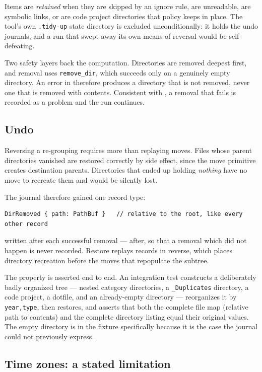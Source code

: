 \documentclass[11pt,a4paper]{article}
\newcommand{\code}[1]{\texttt{\small #1}}
\begin{document}
Items are \emph{retained} when they are skipped by an ignore rule, are unreadable,
are symbolic links, or are code project directories that policy keeps in place. The
tool's own \code{.tidy-up} state directory is excluded unconditionally: it holds the
undo journals, and a run that swept away its own means of reversal would be
self-defeating.

Two safety layers back the computation. Directories are removed deepest first, and
removal uses \code{remove\_dir}, which succeeds only on a genuinely empty directory.
An error in  therefore produces a directory that is not removed,
never one that is removed with contents. Consistent with , a
removal that fails is recorded as a problem and the run continues.

\subsection{Undo}
\label{sec:regroup:undo}

Reversing a re-grouping requires more than replaying moves. Files whose parent
directories vanished are restored correctly by side effect, since the move primitive
creates destination parents. Directories that ended up holding \emph{nothing} have no
move to recreate them and would be silently lost.

The journal therefore gained one record type:

\begin{lstlisting}
DirRemoved { path: PathBuf }   // relative to the root, like every other record
\end{lstlisting}

written after each successful removal --- after, so that a removal which did not
happen is never recorded. Restore replays records in reverse, which places directory
recreation before the moves that repopulate the subtree.

The property is asserted end to end. An integration test constructs a deliberately
badly organized tree --- nested category directories, a \code{\_Duplicates} directory,
a code project, a dotfile, and an already-empty directory --- reorganizes it by
\code{year,type}, then restores, and asserts that both the complete file map (relative
path to contents) and the complete directory listing equal their original values. The
empty directory is in the fixture specifically because it is the case the journal
could not previously express.

\subsection{Time zones: a stated limitation}
\end{document}
